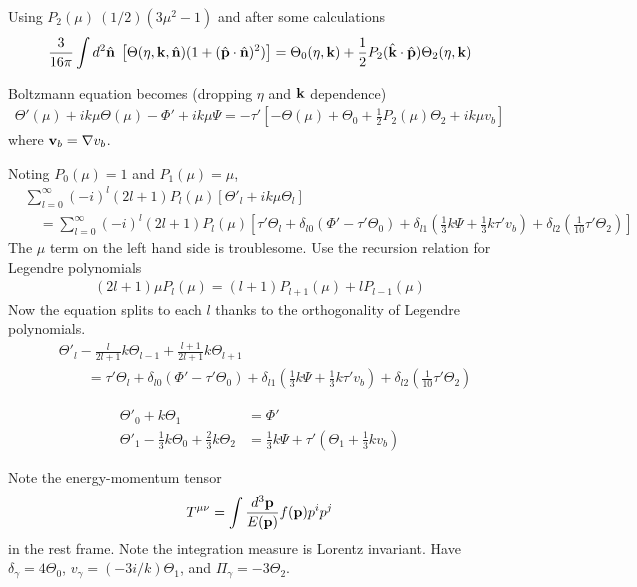 Using $P_2(\mu) \ (1/2)(3\mu^2 -1)$ and after some calculations
\begin{align}
	\frac{3}{16\pi} \int d^2\hat{\mathbf{n}} \; \left[ \Theta(\eta,\mathbf{k},\hat{\mathbf{n}}) (1 + (\hat{\mathbf{p}} \cdot \hat{\mathbf{n}})^2) \right] = \Theta_0 (\eta,\mathbf{k}) + \frac{1}{2} P_2 (\hat{\mathbf{k}} \cdot \hat{\mathbf{p}}) \Theta_2(\eta, \mathbf{k}) 
\end{align}

Boltzmann equation becomes (dropping $\eta$ and $\mathbf{k}$ dependence)
\begin{align}
	\Theta'(\mu) + ik\mu \Theta(\mu) - \Phi' + ik\mu\Psi = -\tau' \left[ - \Theta(\mu) + \Theta_0 + \frac{1}{2}P_2(\mu)\Theta_2 + ik\mu v_b \right]
\end{align}
where $\mathbf{v}_b = \nabla v_b$.

Noting $P_0(\mu) = 1$ and $P_1(\mu)=\mu$,
\begin{align}
	&\sum_{l=0}^{\infty} (-i)^l (2l+1) P_l (\mu) \left[ \Theta'_l + ik\mu \Theta_l \right] \nonumber\\
	&\quad= \sum_{l=0}^{\infty} (-i)^l (2l+1) P_l (\mu) \left[ \tau' \Theta_l + \delta_{l0} (\Phi' - \tau'\Theta_0) + \delta_{l1} (\frac{1}{3}k\Psi + \frac{1}{3}k\tau' v_b) + \delta_{l2}(\frac{1}{10}\tau' \Theta_2) \right]
\end{align}
The $\mu$ term on the left hand side is troublesome. Use the recursion relation for Legendre polynomials
\begin{align}
	(2l+1)\mu P_l(\mu) = (l+1) P_{l+1} (\mu) + l P_{l-1} (\mu)
\end{align}
Now the equation splits to each $l$ thanks to the orthogonality of Legendre polynomials.
\begin{align}
	&\Theta'_l - \frac{l}{2l+1} k\Theta_{l-1} + \frac{l+1}{2l+1} k\Theta_{l+1}  \nonumber\\
	&\qquad= \tau' \Theta_l + \delta_{l0} (\Phi' - \tau' \Theta_0) + \delta_{l1} (\frac{1}{3} k\Psi + \frac{1}{3} k\tau' v_b) + \delta_{l2}(\frac{1}{10}\tau' \Theta_2)
\end{align}

\begin{align}
	\Theta'_0 + k\Theta_1 &= \Phi' \\
	\Theta'_1 - \frac{1}{3} k\Theta_0 +\frac{2}{3} k\Theta_2 &= \frac{1}{3} k \Psi + \tau'(\Theta_1 + \frac{1}{3} k v_b)
\end{align}


Note the energy-momentum tensor
\begin{align}
	T^{\mu\nu} = \int \frac{d^3 \mathbf{p}}{E(\mathbf{p})} f(\mathbf{p}) p^i p^j
\end{align}
in the rest frame. Note the integration measure is Lorentz invariant. Have $\delta_\gamma = 4\Theta_0$, $v_\gamma = (-3i/k) \Theta_1$, and $\Pi_\gamma = -3\Theta_2$.




